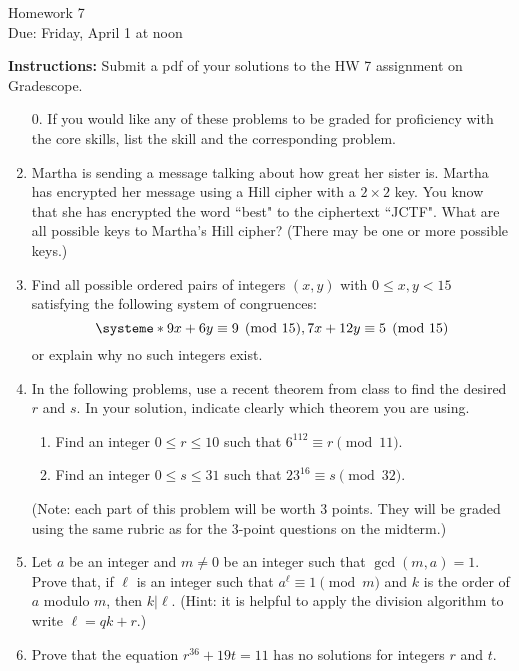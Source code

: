\documentclass[12pt]{article}
\begin{document}
\begin{center}
{\Large Homework 7}\\
Due: Friday,  April 1 at noon\\


\end{center}
{\bf Instructions:} Submit a pdf of your solutions to the HW 7 assignment on Gradescope. 



\begin{enumerate}
\item[0.] If you would like any of these problems to be graded for proficiency with the core skills, list the skill and the corresponding problem. 
\item Martha is sending a message talking about how great her sister is.  Martha has encrypted her message using a Hill cipher with a $2\times 2$ key.  You know that she has encrypted the word ``best" to the ciphertext ``JCTF".  What are all possible keys to Martha's Hill cipher? (There may be one or more possible keys.)

\item Find all possible ordered pairs of integers $(x,y)$ with $0\le x,y<15$ satisfying the following system of congruences:
$$\systeme*{9x+6y\equiv 9\pmod{15}, 7x+12y\equiv 5\pmod{15}}$$ or explain why no such integers exist. 


\item In the following problems,  use a recent theorem from class to find the desired $r$ and $s$.  In your solution, indicate clearly which theorem you are using. 
\begin{enumerate}
\item Find an integer $0\le r\le 10$ such that $6^{112}\equiv r\pmod{11}$.
\item Find an integer $0\le s\le 31$ such that $23^{16}\equiv s\pmod{32}$. 
\end{enumerate}
(Note: each part of this problem will be worth 3 points. They will be graded using the same rubric as for the 3-point questions on the midterm.)

\item Let $a$ be an integer and $m\ne 0$ be an integer such that $\gcd(m,a)=1$.  Prove that, if $\ell$ is an integer such that $a^{\ell}\equiv 1\pmod{m}$ and $k$ is the order of $a$ modulo $m$, then $k|\ell$.  (Hint: it is helpful to apply the division algorithm to write $\ell=qk+r$.)


\item Prove that the equation $r^{36}+19t=11$ has no solutions for integers $r$ and $t$. 
\end{enumerate}
\end{document}
